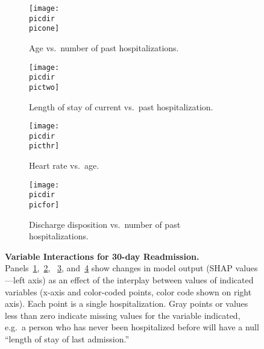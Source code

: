 \begin{figure}
\begin{adjustbox}{minipage=7.0in,frame}
\vspace{2.5mm}
\centering

\def\picdir{supplementary/readmitted30d/}
\def\picone{readmitted30d_SHAP_dependence_2.pdf}
\def\pictwo{readmitted30d_SHAP_dependence_3.pdf}
\def\picthr{readmitted30d_SHAP_dependence_8.pdf}
\def\picfor{readmitted30d_SHAP_dependence_7.pdf}

\begin{subfigure}[t]{.45\linewidth}
    \centering
    \captionsetup[subfigure]{}
    \caption{Age vs.\ number of past hospitalizations.}\label{fig:30dintageadmits}
    \texttt{[image: \\picdir\\picone]}
\end{subfigure}%
\hspace{5mm}%
\begin{subfigure}[t]{.45\linewidth}
    \centering
    \captionsetup[subfigure]{}
    \caption{Length of stay of current vs.\ past hospitalization.}\label{fig:30dintlos}
    \texttt{[image: \\picdir\\pictwo]}
\end{subfigure}%

\vspace{5mm}
\begin{subfigure}[t]{.45\linewidth}
    \centering
    \captionsetup[subfigure]{}
    \caption{Heart rate vs.\ age.}\label{fig:30dinthrage}
    \texttt{[image: \\picdir\\picthr]}
\end{subfigure}%
\hspace{5mm}%
\begin{subfigure}[t]{.45\linewidth}
    \centering
    \captionsetup[subfigure]{}
    \caption{Discharge disposition vs.\ number of past hospitalizations.}\label{fig:30dintdispoadmits}
    \texttt{[image: \\picdir\\picfor]}
\end{subfigure}%

\caption{\textbf{Variable Interactions for 30-day Readmission.} \\
Panels~\ref{fig:30dintageadmits},~\ref{fig:30dintlos},%
~\ref{fig:30dinthrage}, and~\ref{fig:30dintdispoadmits} 
show changes in model output (SHAP values---left axis)
as an effect of the interplay between 
values of indicated variables (x-axis and color-coded points, 
color code shown on right axis).\@
Each point is a single hospitalization.\@
Gray points or values less than zero indicate missing values for the variable indicated,
e.g.\ a person who has never been hospitalized before
will have a null ``length of stay of last admission.''\@
}\label{fig:30dint}
\end{adjustbox}
\end{figure}